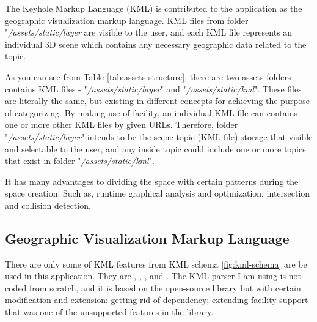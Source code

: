 The Keyhole Markup Language (KML) is contributed to the application as the geographic visualization markup language. KML files from folder "\emph{/assets/static/layer} are visible to the user, and each KML file represents an individual 3D scene which contains any necessary geographic data related to the topic.

As you can see from Table \ref{tab:assets-structure}, there are two assets folders contains KML files - "\emph{/assets/static/layer}" and "\emph{/assets/static/kml}". These files are literally the same, but existing in different concepts for achieving the purpose of categorizing. By making use of  facility, an individual KML file can contains one or more other KML files by given URLs. Therefore, folder "\emph{/assets/static/layer}" intends to be the scene topic (KML file) storage that visible and selectable to the user, and any inside topic could include one or more topics that exist in folder "\emph{/assets/static/kml}".

It has many advantages to dividing the space with certain patterns during the space creation. Such as, runtime graphical analysis and optimization, intersection and collision detection.

\subsection{Geographic Visualization Markup Language}
\label{section:kml}

There are only some of KML features from KML schema \ref{fig:kml-schema} are be used in this application. They are , , , and . The KML parser I am using is not coded from scratch, and it is based on the open-source library  \cite{google.code-kml.2016} but with certain modification and extension: getting rid of  dependency; extending  facility support that was one of the unsupported features in the library.

